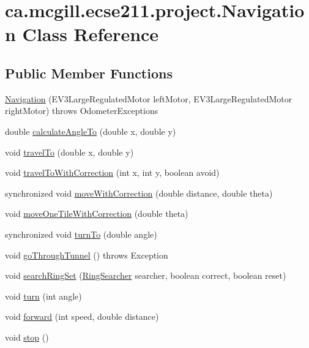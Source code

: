 \hypertarget{classca_1_1mcgill_1_1ecse211_1_1project_1_1_navigation}{}\section{ca.\+mcgill.\+ecse211.\+project.\+Navigation Class Reference}
\label{classca_1_1mcgill_1_1ecse211_1_1project_1_1_navigation}
\subsection*{Public Member Functions}
\begin{DoxyCompactItemize}
\item 
\hyperlink{classca_1_1mcgill_1_1ecse211_1_1project_1_1_navigation_aaee14b67c392ddd951e3ce21224c3e56}{Navigation} (E\+V3\+Large\+Regulated\+Motor left\+Motor, E\+V3\+Large\+Regulated\+Motor right\+Motor)  throws Odometer\+Exceptions 
\item 
double \hyperlink{classca_1_1mcgill_1_1ecse211_1_1project_1_1_navigation_a4376e54162df8f123ca3b52e4fd2f38d}{calculate\+Angle\+To} (double x, double y)
\item 
void \hyperlink{classca_1_1mcgill_1_1ecse211_1_1project_1_1_navigation_ad89b3dd084d81b4ec4d89ea73ba13eaa}{travel\+To} (double x, double y)
\item 
void \hyperlink{classca_1_1mcgill_1_1ecse211_1_1project_1_1_navigation_ae7230e905494002087416294f12cae6a}{travel\+To\+With\+Correction} (int x, int y, boolean avoid)
\item 
synchronized void \hyperlink{classca_1_1mcgill_1_1ecse211_1_1project_1_1_navigation_a48eeb9ae2da23664421e8da5642054c7}{move\+With\+Correction} (double distance, double theta)
\item 
void \hyperlink{classca_1_1mcgill_1_1ecse211_1_1project_1_1_navigation_afbe677941e2bd44e35452e1eff508ae9}{move\+One\+Tile\+With\+Correction} (double theta)
\item 
synchronized void \hyperlink{classca_1_1mcgill_1_1ecse211_1_1project_1_1_navigation_a3bbe0645f2b3b3d0986b4a707fb5a00c}{turn\+To} (double angle)
\item 
void \hyperlink{classca_1_1mcgill_1_1ecse211_1_1project_1_1_navigation_a4b52e605d3ea2f9bcd9481ae2c69ba39}{go\+Through\+Tunnel} ()  throws Exception 
\item 
void \hyperlink{classca_1_1mcgill_1_1ecse211_1_1project_1_1_navigation_a1a808e665b8dd5b8e79b0580724d239c}{search\+Ring\+Set} (\hyperlink{classca_1_1mcgill_1_1ecse211_1_1project_1_1_ring_searcher}{Ring\+Searcher} searcher, boolean correct, boolean reset)
\item 
void \hyperlink{classca_1_1mcgill_1_1ecse211_1_1project_1_1_navigation_ad74286ad36d333bfaf57661837457b76}{turn} (int angle)
\item 
void \hyperlink{classca_1_1mcgill_1_1ecse211_1_1project_1_1_navigation_a7c66610c5b7496ddb35d342ab2cd3f08}{forward} (int speed, double distance)
\item 
void \hyperlink{classca_1_1mcgill_1_1ecse211_1_1project_1_1_navigation_ae8530d181ffd790ff9dea5eeab54b1a1}{stop} ()
\end{DoxyCompactItemize}
